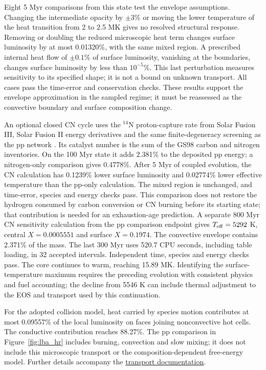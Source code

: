 \documentclass[11pt,letterpaper]{article}
\newcommand{\doc}[2]{\href{https://github.com/oklo/ember/blob/codex/atmosphere5000-density-checks/#1}{#2}}
\begin{document}
Eight 5 Myr comparisons from this state test the envelope assumptions.
Changing the intermediate opacity by $\pm3\%$ or moving the lower
temperature of the heat transition from 2 to 2.5 MK gives no resolved
structural response. Removing or doubling the reduced microscopic heat
term changes surface luminosity by at most 0.01320\%, with the same mixed
region. A prescribed internal heat flow of $\pm0.1\%$ of surface luminosity,
vanishing at the boundaries, changes surface luminosity by less than
$10^{-5}\%$. This last perturbation measures sensitivity to its specified
shape; it is not a bound on unknown transport. All cases pass the time-error
and conservation checks. These results support the envelope approximation
in the sampled regime; it must be reassessed as the convective boundary
and surface composition change.

An optional closed CN cycle uses the $^{14}$N proton-capture rate from
Solar Fusion III, Solar Fusion II energy derivatives and the same
finite-degeneracy screening as the pp network
\cite{acharya25,adelberger11}. Its catalyst number is the sum of the GS98
carbon and nitrogen inventories. On the 100 Myr state it adds 2.381\% to
the deposited pp energy; a nitrogen-only comparison gives 0.4778\%.
After 5 Myr of coupled evolution, the CN calculation has 0.1239\% lower
surface luminosity and 0.02774\% lower effective temperature than the
pp-only calculation. The mixed region is unchanged, and time-error,
species and energy checks pass. This comparison does not restore the
hydrogen consumed by carbon conversion or CN burning before its starting
state; that contribution is needed for an exhaustion-age prediction.
A separate 800 Myr CN sensitivity calculation from the pp comparison
endpoint gives
$T_{\rm eff}=5292$ K, central $X=0.0005551$ and surface $X=0.1974$.
The convective envelope contains 2.371\% of the mass. The last 300 Myr
uses 520.7 CPU seconds, including table loading, in 32 accepted intervals.
Independent time, species and energy checks pass. The core
continues to warm, reaching 15.89 MK. Identifying the surface-temperature
maximum requires the preceding evolution with consistent physics and fuel
accounting; the decline from 5546 K can include thermal adjustment to the
EOS and transport used by this continuation.

For the adopted collision model, heat carried by species motion contributes
at most 0.09557\% of the local luminosity on faces joining nonconvective hot
cells. The conductive contribution reaches 88.27\%. The pp comparison in Figure~\ref{fig:lba_hr}
includes burning, convection and slow mixing; it does not include this
microscopic transport or the composition-dependent free-energy model. Further details accompany the
\doc{docs/DIFFUSION.md}{transport documentation}.
\end{document}
